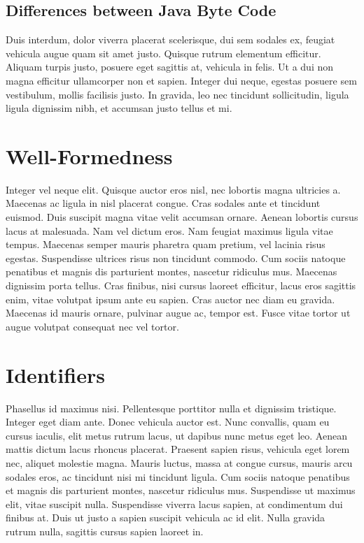 \subsection{Differences between Java Byte Code}
Duis interdum, dolor viverra placerat scelerisque, dui sem sodales ex, feugiat vehicula augue quam sit amet justo. Quisque rutrum elementum efficitur. Aliquam turpis justo, posuere eget sagittis at, vehicula in felis. Ut a dui non magna efficitur ullamcorper non et sapien. Integer dui neque, egestas posuere sem vestibulum, mollis facilisis justo. In gravida, leo nec tincidunt sollicitudin, ligula ligula dignissim nibh, et accumsan justo tellus et mi.

\section{Well-Formedness}
Integer vel neque elit. Quisque auctor eros nisl, nec lobortis magna ultricies a. Maecenas ac ligula in nisl placerat congue. Cras sodales ante et tincidunt euismod. Duis suscipit magna vitae velit accumsan ornare. Aenean lobortis cursus lacus at malesuada. Nam vel dictum eros. Nam feugiat maximus ligula vitae tempus. Maecenas semper mauris pharetra quam pretium, vel lacinia risus egestas. Suspendisse ultrices risus non tincidunt commodo. Cum sociis natoque penatibus et magnis dis parturient montes, nascetur ridiculus mus. Maecenas dignissim porta tellus. Cras finibus, nisi cursus laoreet efficitur, lacus eros sagittis enim, vitae volutpat ipsum ante eu sapien. Cras auctor nec diam eu gravida. Maecenas id mauris ornare, pulvinar augue ac, tempor est. Fusce vitae tortor ut augue volutpat consequat nec vel tortor.


\section{Identifiers}
Phasellus id maximus nisi. Pellentesque porttitor nulla et dignissim tristique. Integer eget diam ante. Donec vehicula auctor est. Nunc convallis, quam eu cursus iaculis, elit metus rutrum lacus, ut dapibus nunc metus eget leo. Aenean mattis dictum lacus rhoncus placerat. Praesent sapien risus, vehicula eget lorem nec, aliquet molestie magna. Mauris luctus, massa at congue cursus, mauris arcu sodales eros, ac tincidunt nisi mi tincidunt ligula. Cum sociis natoque penatibus et magnis dis parturient montes, nascetur ridiculus mus. Suspendisse ut maximus elit, vitae suscipit nulla. Suspendisse viverra lacus sapien, at condimentum dui finibus at. Duis ut justo a sapien suscipit vehicula ac id elit. Nulla gravida rutrum nulla, sagittis cursus sapien laoreet in.


